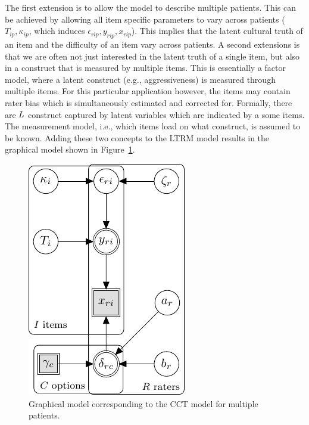 \documentclass{article}
\newcommand{\Irater}{r}
\newcommand{\Iitem}{i}
\newcommand{\Ipatient}{p}
\newcommand{\Ilatent}{l}
\newcommand{\Tlatent}{\expandafter\MakeUppercase\expandafter{\Ilatent}}
\begin{document}
The first extension is to allow the model to describe multiple patients. This can be achieved by allowing all item specific parameters to vary across patients ($T_{\Iitem\Ipatient}, \kappa_{\Iitem\Ipatient}$, which induces $\epsilon_{\Irater\Iitem\Ipatient}, y_{\Irater\Iitem\Ipatient}, x_{\Irater\Iitem\Ipatient}$). This implies that the latent cultural truth of an item and the difficulty of an item vary across patients. A second extensions is that we are often not just interested in the latent truth of a single item, but also in a construct that is measured by multiple items. This is essentially a factor model, where a latent construct (e.g., aggressiveness) is measured through multiple items. For this particular application however, the items may contain rater bias which is simultaneously estimated and corrected for. Formally, there are $\Tlatent$ construct captured by latent variables which are indicated by a some items. The measurement model, i.e., which items load on what construct, is assumed to be known. Adding these two concepts to the LTRM model results in the graphical model shown in Figure~\ref{model:LTRM2}.
\begin{figure}[!ht]
	\centering
	\includegraphics[width=.6\textwidth, page=2]{graphicalModels/graphicalModels.pdf}
	\caption{Graphical model corresponding to the CCT model for multiple patients.}
	\label{model:LTRM2}
\end{figure}
\end{document}
